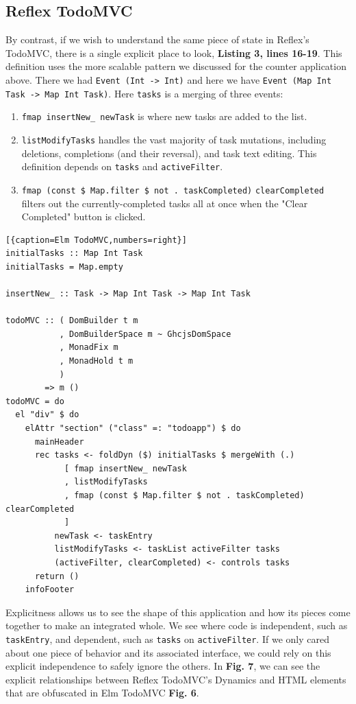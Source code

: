 \documentclass[sigconf]{acmart}
\begin{document}
\subsection{Reflex TodoMVC}

By contrast, if we wish to understand the same piece of state in Reflex's TodoMVC, there is a single explicit place to look, \textbf{Listing 3, lines 16-19}. This definition uses the more scalable pattern we discussed for the counter application above. There we had \lstinline{Event (Int -> Int)} and here we have \lstinline{Event (Map Int Task -> Map Int Task)}. Here \lstinline{tasks} is a merging of three events:

\begin{enumerate}
\item \lstinline{fmap insertNew_ newTask} is where new tasks are added to the list.
\item \lstinline{listModifyTasks} handles the vast majority of task mutations, including deletions, completions (and their reversal), and task text editing. This definition depends on \lstinline{tasks} and \lstinline{activeFilter}.
\item \lstinline{fmap (const $ Map.filter $ not . taskCompleted)}  \newline \lstinline{clearCompleted} filters out the currently-completed tasks all at once when the "Clear Completed" button is clicked.
\end{enumerate}

\begin{lstlisting}[{caption=Elm TodoMVC,numbers=right}]
initialTasks :: Map Int Task
initialTasks = Map.empty

insertNew_ :: Task -> Map Int Task -> Map Int Task

todoMVC :: ( DomBuilder t m
           , DomBuilderSpace m ~ GhcjsDomSpace
           , MonadFix m
           , MonadHold t m
           )
        => m ()
todoMVC = do
  el "div" $ do
    elAttr "section" ("class" =: "todoapp") $ do
      mainHeader
      rec tasks <- foldDyn ($) initialTasks $ mergeWith (.)
            [ fmap insertNew_ newTask
            , listModifyTasks
            , fmap (const $ Map.filter $ not . taskCompleted) clearCompleted
            ]
          newTask <- taskEntry
          listModifyTasks <- taskList activeFilter tasks
          (activeFilter, clearCompleted) <- controls tasks
      return ()
    infoFooter
\end{lstlisting}

Explicitness allows us to see the shape of this application and how its pieces come together to make an integrated whole. We see where code is independent, such as \lstinline{taskEntry}, and dependent, such as \lstinline{tasks} on \lstinline{activeFilter}. If we only cared about one piece of behavior and its associated interface, we could rely on this explicit independence to safely ignore the others. In \textbf{Fig. 7}, we can see the explicit relationships between Reflex TodoMVC's Dynamics and HTML elements that are obfuscated in Elm TodoMVC \textbf{Fig. 6}.
\end{document}
